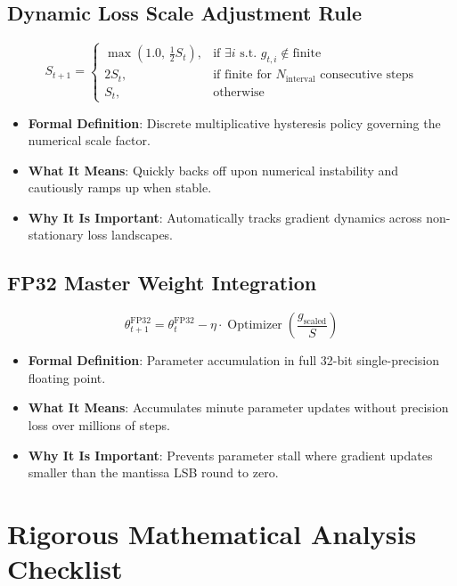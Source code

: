 \documentclass[11pt,a4paper]{article}
\theoremstyle{definition}
\begin{document}
\subsection{Dynamic Loss Scale Adjustment Rule}
{\boldmath
\begin{equation}
S_{t+1} = \begin{cases}
\max(1.0, \, \frac{1}{2} S_t), & \text{if } \exists i \text{ s.t. } g_{t, i} \notin \text{finite} \\
2 S_t, & \text{if finite for } N_{\text{interval}} \text{ consecutive steps} \\
S_t, & \text{otherwise}
\end{cases}
\end{equation}
}
\begin{itemize}
    \item \textbf{Formal Definition}: Discrete multiplicative hysteresis policy governing the numerical scale factor.
    \item \textbf{What It Means}: Quickly backs off upon numerical instability and cautiously ramps up when stable.
    \item \textbf{Why It Is Important}: Automatically tracks gradient dynamics across non-stationary loss landscapes.
\end{itemize}

\subsection{FP32 Master Weight Integration}
{\boldmath
\begin{equation}
\theta_{t+1}^{\text{FP32}} = \theta_t^{\text{FP32}} - \eta \cdot \operatorname{Optimizer}\left( \frac{g_{\text{scaled}}}{S} \right)
\end{equation}
}
\begin{itemize}
    \item \textbf{Formal Definition}: Parameter accumulation in full 32-bit single-precision floating point.
    \item \textbf{What It Means}: Accumulates minute parameter updates without precision loss over millions of steps.
    \item \textbf{Why It Is Important}: Prevents parameter stall where gradient updates smaller than the mantissa LSB round to zero.
\end{itemize}

\section{Rigorous Mathematical Analysis Checklist}
\end{document}
